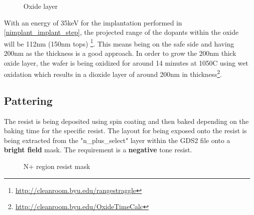 \begin{figure}[H]
	\centering
	\begin{tikzpicture}[node distance = 3cm, auto, thick,scale=\CrossSectionOnly, every node/.style={transform shape}]
		
	\end{tikzpicture}
	\begin{tikzpicture}[node distance = 3cm, auto, thick,scale=\CrossSectionOnly, every node/.style={transform shape}]
		
	\end{tikzpicture}
	\caption{Oxide layer}
\end{figure}

With an energy of 35keV for the implantation performed in \autoref{nimplant_implant_step}, the projected range of the dopants within the oxide will be 112nm (150nm tops) \footnote{\url{http://cleanroom.byu.edu/rangestraggle}}.
This means being on the safe side and having 200nm as the thickness is a good approach.
In order to grow the 200nm thick oxide layer, the wafer is being oxidized for around 14 minutes at 1050\degree C using wet oxidation which results in a dioxide layer of around 200nm in thickness\footnote{\url{http://cleanroom.byu.edu/OxideTimeCalc}}.

\subsection{Pattering}

The resist is being deposited using spin coating and then baked depending on the baking time for the specific resist.
The layout for being exposed onto the resist is being extracted from the "n\_plus\_select" layer within the GDS2 file onto a \textbf{bright field} mask.
The requirement is a \textbf{negative} tone resist.

\begin{figure}[H]
	\centering
	\begin{tikzpicture}[node distance = 3cm, auto, thick,scale=\CrossAndTopSection, every node/.style={transform shape}]
		
	\end{tikzpicture}
	\begin{tikzpicture}[node distance = 3cm, auto, thick,scale=\CrossAndTopSection, every node/.style={transform shape}]
		
	\end{tikzpicture}
	\begin{tikzpicture}[node distance = 3cm, auto, thick,scale=\CrossAndTopSection, every node/.style={transform shape}]
		
	\end{tikzpicture}
	\begin{tikzpicture}[node distance = 3cm, auto, thick,scale=\CrossAndTopSection, every node/.style={transform shape}]
		
	\end{tikzpicture}
	\caption{N+ region resist mask}
\end{figure}

